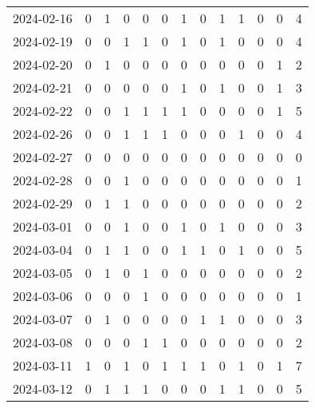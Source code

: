 \documentclass[dvipdfmx,oneside]{article}
\begin{document}
\begin{longtable}{lcccccccccccc}
        2024-02-16 &     0 &     1 &     0 &     0 &     0 &     1 &     0 &     1 &     1 &     0 &     0 &      4 \\
        2024-02-19 &     0 &     0 &     1 &     1 &     0 &     1 &     0 &     1 &     0 &     0 &     0 &      4 \\
        2024-02-20 &     0 &     1 &     0 &     0 &     0 &     0 &     0 &     0 &     0 &     0 &     1 &      2 \\
        2024-02-21 &     0 &     0 &     0 &     0 &     0 &     1 &     0 &     1 &     0 &     0 &     1 &      3 \\
        2024-02-22 &     0 &     0 &     1 &     1 &     1 &     1 &     0 &     0 &     0 &     0 &     1 &      5 \\
        2024-02-26 &     0 &     0 &     1 &     1 &     1 &     0 &     0 &     0 &     1 &     0 &     0 &      4 \\
        2024-02-27 &     0 &     0 &     0 &     0 &     0 &     0 &     0 &     0 &     0 &     0 &     0 &      0 \\
        2024-02-28 &     0 &     0 &     1 &     0 &     0 &     0 &     0 &     0 &     0 &     0 &     0 &      1 \\
        2024-02-29 &     0 &     1 &     1 &     0 &     0 &     0 &     0 &     0 &     0 &     0 &     0 &      2 \\
        2024-03-01 &     0 &     0 &     1 &     0 &     0 &     1 &     0 &     1 &     0 &     0 &     0 &      3 \\
        2024-03-04 &     0 &     1 &     1 &     0 &     0 &     1 &     1 &     0 &     1 &     0 &     0 &      5 \\
        2024-03-05 &     0 &     1 &     0 &     1 &     0 &     0 &     0 &     0 &     0 &     0 &     0 &      2 \\
        2024-03-06 &     0 &     0 &     0 &     1 &     0 &     0 &     0 &     0 &     0 &     0 &     0 &      1 \\
        2024-03-07 &     0 &     1 &     0 &     0 &     0 &     0 &     1 &     1 &     0 &     0 &     0 &      3 \\
        2024-03-08 &     0 &     0 &     0 &     1 &     1 &     0 &     0 &     0 &     0 &     0 &     0 &      2 \\
        2024-03-11 &     1 &     0 &     1 &     0 &     1 &     1 &     1 &     0 &     1 &     0 &     1 &      7 \\
        2024-03-12 &     0 &     1 &     1 &     1 &     0 &     0 &     0 &     1 &     1 &     0 &     0 &      5 \\

\end{longtable}
\end{document}
